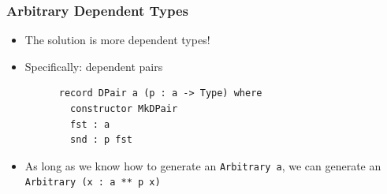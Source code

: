 \documentclass[compress]{beamer}
\begin{document}
\begin{frame}[fragile]
  \frametitle{Arbitrary Dependent Types}

  \large

  \begin{itemize}
    \item<1-> The solution is more dependent types!
    \item<2-> Specifically: dependent pairs

    \begin{verbatim}
      record DPair a (p : a -> Type) where
        constructor MkDPair
        fst : a
        snd : p fst
    \end{verbatim}


    \item<3-> As long as we know how to generate an {\textasciigrave
              \texttt{Arbitrary a}\textasciigrave}, we can generate
              an {\textasciigrave
              \texttt{Arbitrary (x : a ** p x)}\textasciigrave}
  \end{itemize}

\end{frame}
\end{document}
